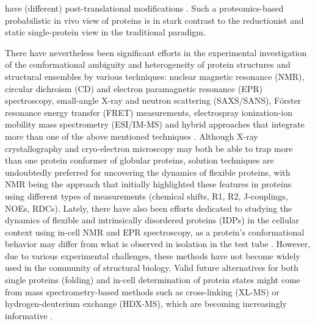 have (different) post-translational modifications \cite{vu_protein_2018}. Such a proteomics-based probabilistic in vivo view of proteins is in stark contrast to the reductionist and static single-protein view in the traditional paradigm.

There have nevertheless been significant efforts in the experimental investigation of the conformational ambiguity and heterogeneity of protein structures and structural ensembles by various techniques: nuclear magnetic resonance (NMR), circular dichroism (CD) and electron paramagnetic resonance (EPR) spectroscopy, small-angle X-ray and neutron scattering (SAXS/SANS), Förster resonance energy transfer (FRET) measurements, electrospray ionization-ion mobility mass spectrometry (ESI/IM-MS) and hybrid approaches that integrate more than one of the above mentioned techniques \cite{dobson_biophysical_2019}. Although X-ray crystallography and cryo-electron microscopy may both be able to trap more than one protein conformer of globular proteins, solution techniques are undoubtedly preferred for uncovering the dynamics of flexible proteins, with NMR being the approach that initially highlighted these features in proteins using different types of measurements (chemical shifts, R1, R2, J-couplings, NOEs, RDCs). Lately, there have also been efforts dedicated to studying the dynamics of flexible and intrinsically disordered proteins (IDPs) in the cellular context using in-cell NMR and EPR spectroscopy, as a protein’s conformational behavior may differ from what is observed in isolation in the test tube \cite{kragelund_-cell_2020, bonucci_crowding_2021}. However, due to various experimental challenges, these methods have not become widely used in the community of structural biology. Valid future alternatives for both single proteins (folding) and in-cell determination of protein states might come from mass spectrometry-based methods such as cross-linking (XL-MS) or hydrogen-deuterium exchange (HDX-MS), which are becoming increasingly informative \cite{britt_integration_2022}.

